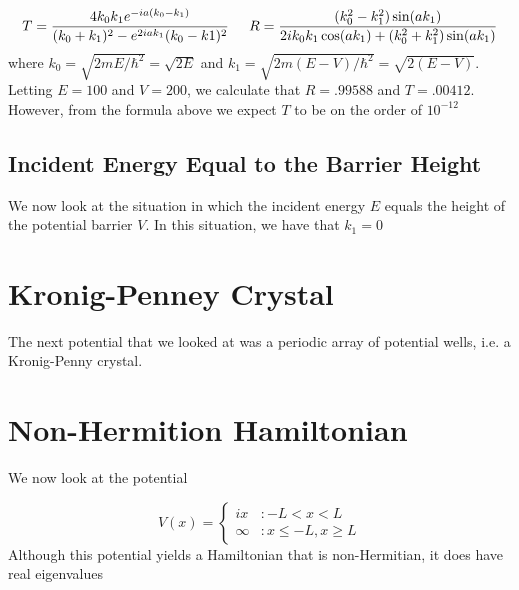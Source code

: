 \documentclass{article}
\begin{document}
\begin{equation}
T = \frac{4k_0 k_1 e^{-ia(k_0-k_1)}}{(k_0 + k_1)^2 - e^{2iak_1}(k_0-k1)^2} \hspace{0.2in} R = \frac{(k_0^2-k_1^2)\sin(ak_1)}{2ik_0k_1\cos(ak_1)+(k_0^2+k_1^2)\sin(ak_1)}
\end{equation}
%
where $k_0 = \sqrt{2mE/\hbar^2} = \sqrt{2E}$ and $k_1 = \sqrt{2m(E-V)/\hbar^2} = \sqrt{2(E-V)}$. Letting $E = 100$ and $V = 200$, we calculate that $R = .99588$ and $T = .00412$. However, from the formula above we expect $T$ to be on the order of $10^{-12}$

\subsection{Incident Energy Equal to the Barrier Height}

We now look at the situation in which the incident energy $E$ equals the height of the potential barrier $V$. In this situation, we have that $k_1 = 0$


\section{Kronig-Penney Crystal}

The next potential that we looked at was a periodic array of potential wells, i.e. a Kronig-Penny crystal. 

\section{Non-Hermition Hamiltonian}

We now look at the potential 

\[V(x) = \left\{
  \begin{array}{lr}
    ix &  : -L < x  < L \\
    \infty & : x \leq -L , x \geq L 
  \end{array}
\right.
\]
%
Although this potential yields a Hamiltonian that is non-Hermitian, it does have real eigenvalues 
\end{document}

